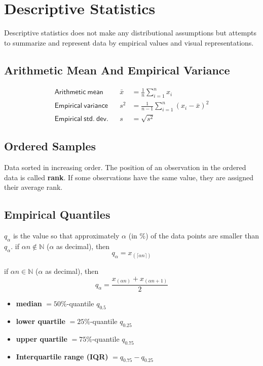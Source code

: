 \section{Descriptive Statistics}
Descriptive statistics does not make any distributional assumptions but attempts to summarize and represent data by empirical values and visual representations.
\subsection{Arithmetic Mean And Empirical Variance}
\noindent\begin{align*}
    \mathsf{Arithmetic\ mean}      &  & \bar{x}      & =\frac{1}{n}\sum_{i=1}^{n}x_i                 \\
    \mathsf{Empirical\ variance}   &  & s^2          & =\frac{1}{n-1}\sum_{i=1}^{n}{(x_i-\bar{x})}^2 \\
    \mathsf{Empirical\ std.\ dev.} &  & s&=\sqrt{s^2}
\end{align*}

\subsection{Ordered Samples}

Data sorted in increasing order. The position of an observation in the ordered data is called \textbf{rank}. If some observations have the same value, they are assigned their average rank.

\subsection{Empirical Quantiles}
$q_\alpha$ is the value so that approximately $\alpha$ (in $\%$) of the data points are smaller than $q_\alpha$.
\newpar{}
if $\alpha n \notin \mathbb{N}$ ($\alpha$ as decimal), then
\begin{equation*}
    q_\alpha = x_{(\lceil\alpha n\rceil)}
\end{equation*}

if $\alpha n \in \mathbb{N}$ ($\alpha$ as decimal), then
\begin{equation*}
    q_\alpha = \frac{x_{(\alpha n)}+x_{(\alpha n+1)}}{2}
\end{equation*}

\newpar{}
\begin{itemize}
    \item \textbf{median} $= 50\%$-quantile $q_{0.5}$
    \item \textbf{lower quartile} $= 25\%$-quantile $q_{0.25}$
    \item \textbf{upper quartile} $= 75\%$-quantile $q_{0.75}$
    \item \textbf{Interquartile range (IQR)} $= q_{0.75} - q_{0.25}$
\end{itemize}

